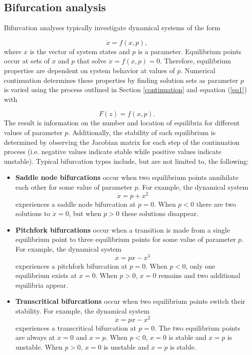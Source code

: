 \documentclass[12pt]{article}
\begin{document}
\subsection{Bifurcation analysis}
Bifurcation analyses typically investigate dynamical systems of the form 

\begin{equation}
\label{bf1}
\dot{x}=f(x,p),
\end{equation}
where $x$ is the vector of system states and $p$ is a parameter. Equilibrium points occur at sets of $x$ and $p$ that solve $\dot{x}=f(x,p)=0$. Therefore, equilibrium properties are dependent on system behavior at values of $p$. Numerical continuation determines these properties by finding solution sets as parameter $p$ is varied using the process outlined in Section \ref{continuation} and equation (\ref{eq1}) with 

\begin{equation}
\label{bf2}
F(z)=f(x,p).
\end{equation}
The result is information on the number and location of equilibria for different values of parameter $p$. Additionally, the stability of each equilibrium is determined by observing the Jacobian matrix for each step of the continuation process (i.e. negative values indicate stable while positive values indicate unstable). Typical bifurcation types include, but are not limited to, the following:

\begin{itemize}
\item \textbf{Saddle node bifurcations} occur when two equilibrium points annihilate each other for some value of parameter $p$. For example, the dynamical system 
\begin{equation}
\label{bf3}
\dot{x}=p+x^2
\end{equation}
experiences a saddle node bifurcation at $p=0$. When $p<0$ there are two solutions to $\dot{x}=0$, but when $p>0$ these solutions disappear. 
\item \textbf{Pitchfork bifurcations} occur when a transition is made from a single equilibrium point to three equilibrium points for some value of parameter $p$. For example, the dynamical system 
\begin{equation}
\label{bf4}
\dot{x}=px-x^3
\end{equation}
experiences a pitchfork bifurcation at $p=0$. When $p<0$, only one equilibrium exists at $x=0$. When $p>0$, $x=0$ remains and two additional equilibria appear.
\item \textbf{Transcritical bifurcations} occur when two equilibrium points switch their stability. For example, the dynamical system 
\begin{equation}
\label{bf5}
\dot{x}=px-x^2
\end{equation}
experiences a transcritical bifurcation at $p=0$. The two equilibrium points are always at $x=0$ and $x=p$. When $p<0$, $x=0$ is stable and $x=p$ is unstable. When $p>0$, $x=0$ is unstable and $x=p$ is stable.
\end{itemize}
\end{document}
